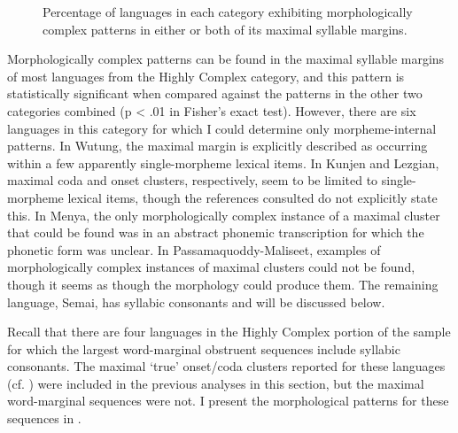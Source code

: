 \begin{figure}  
\caption{\label{fig:3.7} Percentage of languages in each category exhibiting morphologically complex patterns in either or both of its maximal syllable margins.}
\end{figure}

  Morphologically complex patterns can be found in the maximal syllable margins of most languages from the Highly Complex category, and this pattern is statistically significant when compared against the patterns in the other two categories combined (p < .01 in Fisher’s exact test). However, there are six languages in this category for which I could determine only morpheme-internal patterns. In Wutung, the maximal margin is explicitly described as occurring within a few apparently single-morpheme lexical items. In Kunjen and Lezgian, maximal coda and onset clusters, respectively, seem to be limited to single-morpheme lexical items, though the references consulted do not explicitly state this. In Menya, the only morphologically complex instance of a maximal cluster that could be found was in an abstract phonemic transcription for which the phonetic form was unclear. In Passamaquoddy-Maliseet, examples of morphologically complex instances of maximal clusters could not be found, though it seems as though the morphology could produce them. The remaining language, Semai, has syllabic consonants and will be discussed below.

  Recall that there are four languages in the Highly Complex portion of the sample for which the largest word-marginal obstruent sequences include syllabic consonants. The maximal ‘true’ onset/coda clusters reported for these languages (cf. ) were included in the previous analyses in this section, but the maximal word-marginal sequences were not. I present the morphological patterns for these sequences in .

